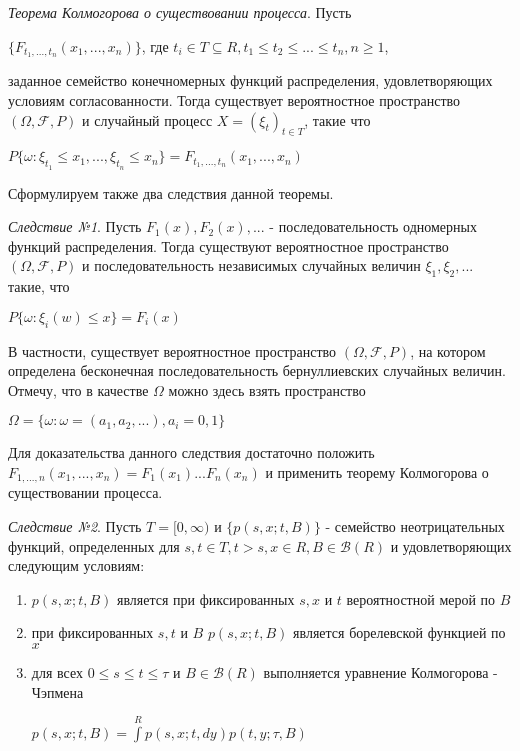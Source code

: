 \documentclass[12pt]{article}
\begin{document}
\textit{Теорема Колмогорова о существовании процесса}. Пусть 
\begin{center}
$\lbrace F_{t_{1}, ..., t_{n}}(x_1, ..., x_n) \rbrace $, где $t_i \in T \subseteq R, t_1 \le t_2 \le ... \le t_n, n \geq 1$,
\end{center}
заданное семейство конечномерных функций распределения, удовлетворяющих условиям согласованности. Тогда существует вероятностное пространство $(\Omega , \mathscr{F}, P)$ и случайный процесс $X = (\xi_{t})_{t \in T }$, такие что 
\begin{center}
$P \lbrace \omega : \xi_{t_1} \leq x_1, ..., \xi_{t_n} \leq x_n \rbrace = F_{{t_1}, ..., {t_n}} (x_1, ..., x_n) $
\end{center}

Сформулируем также два следствия данной теоремы.

\textit{Следствие №1}. Пусть $F_1 (x),  F_2 (x), ...$ - последовательность одномерных функций распределения. Тогда существуют вероятностное пространство $(\Omega , \mathscr{F}, P)$ и последовательность независимых случайных величин $\xi_1,  \xi_2, ... $ такие, что
\begin{center}
$P \lbrace \omega : \xi_i (w) \leq x \rbrace = F_i (x)$
\end{center}
В частности, существует вероятностное пространство $(\Omega , \mathscr{F}, P)$, на котором определена бесконечная последовательность бернуллиевских случайных величин. Отмечу, что в качестве $\Omega$ можно здесь взять пространство
\begin{center}
$\Omega = \lbrace \omega : \omega = (a_1, a_2, ...), a_i = 0, 1 \rbrace$
\end{center}

Для доказательства данного следствия достаточно положить $F_{1, ..., n} (x_1, ..., x_n) = F_1 (x_1) ... F_n (x_n)$ и применить теорему Колмогорова о существовании процесса.

\textit{Следствие №2}. Пусть $T = [0, \infty)$ и $\lbrace p(s, x; t, B)\rbrace$ - семейство неотрицательных функций, определенных для $s, t \in T, t > s, x \in R, B \in \mathscr{B}(R)$ и удовлетворяющих следующим условиям:
\begin{enumerate}
\item $p(s, x; t, B)$ является при фиксированных $s, x$ и $t$ вероятностной мерой по $B$
\item при фиксированных $s, t$ и $B$  $p(s, x; t, B)$ является борелевской функцией по $x$
\item для всех $0 \leq s \le t \le \tau$ и $B \in \mathscr{B}(R)$ выполняется уравнение Колмогорова - Чэпмена
\begin{center}
$p(s, x; t, B) = \int\limits_{}^{R} p(s, x; t, dy)p(t, y; \tau, B)$
\end{center}
\end{enumerate}
\end{document}
